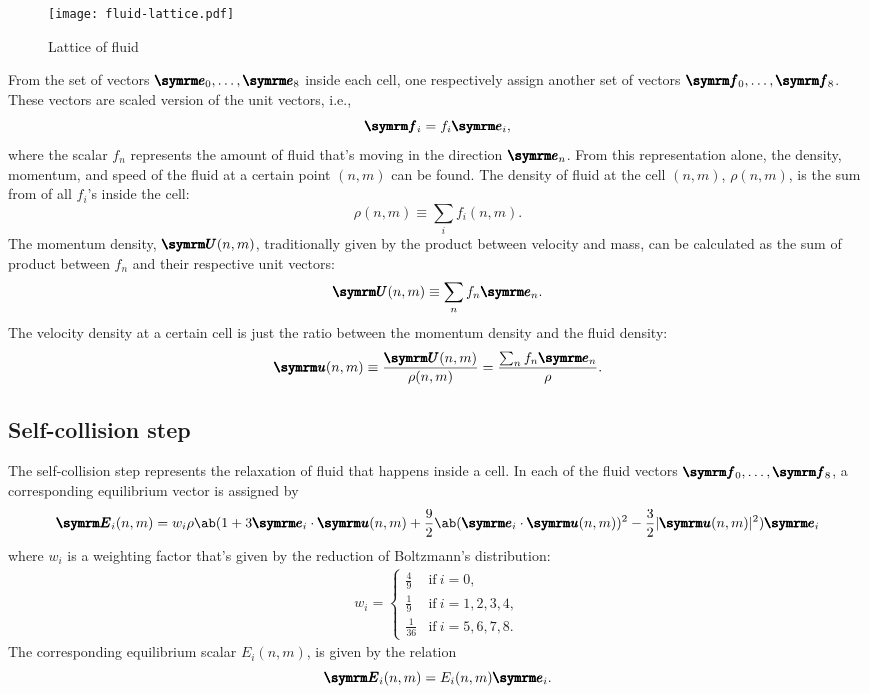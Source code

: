 \begin{figure}[ht]
	\centering
	\texttt{[image: fluid-lattice.pdf]}
	\caption{Lattice of fluid}
	\label{fig:fluid-lattice}
\end{figure}

From the set of vectors $\vv{e}_0, \dots, \vv{e}_8$ inside each cell, one respectively assign another set of vectors $\vv{f}_0, \dots, \vv{f}_8$. These vectors are scaled version of the unit vectors, i.e.,
\begin{equation}
	\vv{f}_i = f_i\vv{e}_i,
\end{equation}
where the scalar $f_n$ represents the amount of fluid that's moving in the direction $\vv{e}_n$. From this representation alone, the density, momentum, and speed of the fluid at a certain point $(n, m)$ can be found. The density of fluid at the cell $(n, m)$, $\rho(n, m)$, is the sum from of all $f_i$'s inside the cell:
\begin{equation}
	\rho(n, m) \equiv \sum_if_i(n, m). \label{eq:density-calculation}
\end{equation}
The momentum density, $\vv{U}(n, m)$, traditionally given by the product between velocity and mass, can be calculated as the sum of product between $f_n$ and their respective unit vectors:
\begin{equation}
	\vv{U}(n, m) \equiv \sum_nf_n\vv{e}_n. \label{eq:momentum-calculation}
\end{equation}
The velocity density at a certain cell is just the ratio between the momentum density and the fluid density:
\begin{equation}
	\vv{u}(n, m) \equiv \frac{\vv{U}(n, m)}{\rho(n, m)} = \frac{\sum_nf_n\vv{e}_n}{\rho}. \label{eq:velocity-calculation}
\end{equation}

\subsection{Self-collision step}

The self-collision step represents the relaxation of fluid that happens inside a cell. In each of the fluid vectors $\vv{f}_0,\dots,\vv{f}_8$, a corresponding equilibrium vector is assigned by
\begin{equation}
	\vv{E}_i(n, m) = w_i\rho\ab(1 + 3\vv{e}_i \cdot \vv{u}(n, m) + \frac{9}{2}\ab(\vv{e}_i \cdot \vv{u}(n, m))^2 - \frac{3}{2}|\vv{u}(n, m)|^2)\vv{e}_i
\end{equation}
where $w_i$ is a weighting factor that's given by the reduction of Boltzmann's distribution:
\begin{gather}
	w_i = \begin{cases}
		\frac{4}{9}  & \textrm{if} ~ i = 0,          \\
		\frac{1}{9}  & \textrm{if} ~ i = 1, 2, 3, 4, \\
		\frac{1}{36} & \textrm{if} ~ i = 5, 6, 7, 8.
	\end{cases}
\end{gather}
The corresponding equilibrium scalar $E_i(n, m)$, is given by the relation
\begin{equation}
	\vv{E}_i(n, m) = E_i(n, m)\vv{e}_i.
\end{equation}

